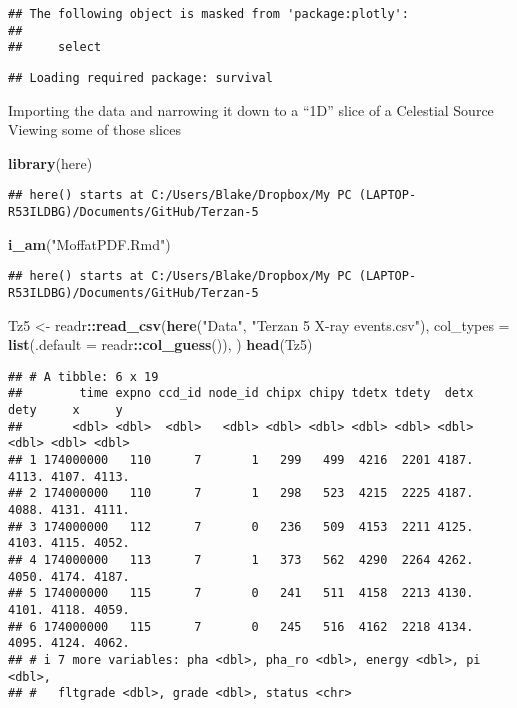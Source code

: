 \documentclass[
]{article}
\newenvironment{Shaded}{\begin{snugshade}}{\end{snugshade}}
\newcommand{\AttributeTok}[1]{\textcolor[rgb]{0.13,0.29,0.53}{#1}}
\newcommand{\FunctionTok}[1]{\textcolor[rgb]{0.13,0.29,0.53}{\textbf{#1}}}
\newcommand{\NormalTok}[1]{#1}
\newcommand{\OtherTok}[1]{\textcolor[rgb]{0.56,0.35,0.01}{#1}}
\newcommand{\SpecialCharTok}[1]{\textcolor[rgb]{0.81,0.36,0.00}{\textbf{#1}}}
\newcommand{\StringTok}[1]{\textcolor[rgb]{0.31,0.60,0.02}{#1}}
\begin{document}
\begin{verbatim}
## The following object is masked from 'package:plotly':
## 
##     select
\end{verbatim}

\begin{verbatim}
## Loading required package: survival
\end{verbatim}

Importing the data and narrowing it down to a ``1D'' slice of a
Celestial Source Viewing some of those slices

\begin{Shaded}
\begin{Highlighting}[]
\FunctionTok{library}\NormalTok{(here)}
\end{Highlighting}
\end{Shaded}

\begin{verbatim}
## here() starts at C:/Users/Blake/Dropbox/My PC (LAPTOP-R53ILDBG)/Documents/GitHub/Terzan-5
\end{verbatim}

\begin{Shaded}
\begin{Highlighting}[]
\FunctionTok{i\_am}\NormalTok{(}\StringTok{"MoffatPDF.Rmd"}\NormalTok{)}
\end{Highlighting}
\end{Shaded}

\begin{verbatim}
## here() starts at C:/Users/Blake/Dropbox/My PC (LAPTOP-R53ILDBG)/Documents/GitHub/Terzan-5
\end{verbatim}

\begin{Shaded}
\begin{Highlighting}[]
\NormalTok{Tz5 }\OtherTok{\textless{}{-}}\NormalTok{ readr}\SpecialCharTok{::}\FunctionTok{read\_csv}\NormalTok{(}\FunctionTok{here}\NormalTok{(}\StringTok{"Data"}\NormalTok{, }\StringTok{"Terzan 5 X{-}ray events.csv"}\NormalTok{), }\AttributeTok{col\_types =} \FunctionTok{list}\NormalTok{(}\AttributeTok{.default =}\NormalTok{ readr}\SpecialCharTok{::}\FunctionTok{col\_guess}\NormalTok{()), )}
\FunctionTok{head}\NormalTok{(Tz5)}
\end{Highlighting}
\end{Shaded}

\begin{verbatim}
## # A tibble: 6 x 19
##        time expno ccd_id node_id chipx chipy tdetx tdety  detx  dety     x     y
##       <dbl> <dbl>  <dbl>   <dbl> <dbl> <dbl> <dbl> <dbl> <dbl> <dbl> <dbl> <dbl>
## 1 174000000   110      7       1   299   499  4216  2201 4187. 4113. 4107. 4113.
## 2 174000000   110      7       1   298   523  4215  2225 4187. 4088. 4131. 4111.
## 3 174000000   112      7       0   236   509  4153  2211 4125. 4103. 4115. 4052.
## 4 174000000   113      7       1   373   562  4290  2264 4262. 4050. 4174. 4187.
## 5 174000000   115      7       0   241   511  4158  2213 4130. 4101. 4118. 4059.
## 6 174000000   115      7       0   245   516  4162  2218 4134. 4095. 4124. 4062.
## # i 7 more variables: pha <dbl>, pha_ro <dbl>, energy <dbl>, pi <dbl>,
## #   fltgrade <dbl>, grade <dbl>, status <chr>
\end{verbatim}
\end{document}
